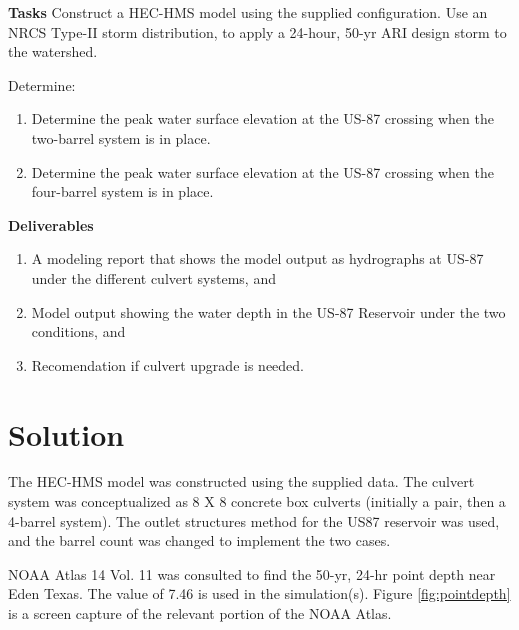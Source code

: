 \documentclass[12pt]{article}
\begin{document}
\begin{enumerate}
\clearpage

\textbf{Tasks}
Construct a HEC-HMS model using the supplied configuration. Use an NRCS Type-II storm distribution, to apply a 24-hour, 50-yr ARI design storm to the watershed.

Determine:
\begin{enumerate}
\item Determine the peak water surface elevation at the US-87 crossing when the two-barrel system is in place.
\item Determine the peak water surface elevation at the US-87 crossing when the four-barrel system is in place.
\end{enumerate}

\textbf{Deliverables}
\begin{enumerate}
\item A modeling report that shows the model output as hydrographs at US-87 under the different culvert systems, and
\item Model output showing the water depth in the US-87 Reservoir under the two conditions, and
\item Recomendation if culvert upgrade is needed.
\end{enumerate}

\end{enumerate}


\clearpage

\section*{\small{Solution}}

The HEC-HMS model was constructed using the supplied data.  The culvert system was conceptualized as 8 X 8 concrete box culverts (initially a pair, then a 4-barrel system).  The outlet structures method for the US87 reservoir was used, and the barrel count was changed to implement the two cases.

NOAA Atlas 14 Vol. 11 was consulted to find the 50-yr, 24-hr point depth near Eden Texas.  The value of 7.46 is used in the simulation(s).  Figure \ref{fig:pointdepth} is a screen capture of the relevant portion of the NOAA Atlas.
\end{document}
